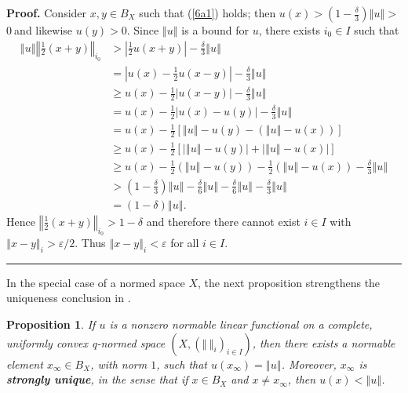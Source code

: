 \documentclass[11pt]{article}%
\newtheorem{proposition}[theorem]{Proposition}
\newenvironment{proof}[1][Proof]{\noindent\textbf{#1.} }{\ \rule{0.5em}{0.5em}}
\begin{document}
\begin{proof}
Consider $x,y\in B_{X}$ such that (\ref{6a1}) holds; then $u(x)>\left(
1-\frac{\delta}{3}\right)  \left\Vert u\right\Vert >$ $0\ $and likewise
$u(y)>0$. Since $\left\Vert u\right\Vert $ is a bound for $u$, there exists
$i_{0}\in I$ such that%
\begin{align*}
\left\Vert u\right\Vert \left\Vert \frac{1}{2}\left(  x+y\right)  \right\Vert
_{i_{0}} &  >\left\vert \frac{1}{2}u(x+y)\right\vert -\frac{\delta}%
{3}\left\Vert u\right\Vert \\
&  =\left\vert u(x)-\frac{1}{2}u(x-y)\right\vert -\frac{\delta}{3}\left\Vert
u\right\Vert \\
&  \geq u(x)-\frac{1}{2}\left\vert u(x-y)\right\vert -\frac{\delta}%
{3}\left\Vert u\right\Vert \\
&  =u(x)-\frac{1}{2}\left\vert u(x)-u(y)\right\vert -\frac{\delta}%
{3}\left\Vert u\right\Vert \\
&  =u(x)-\frac{1}{2}\left[  \left\Vert u\right\Vert -u(y)-\left(  \left\Vert
u\right\Vert -u(x)\right)  \right]  \\
&  \geq u(x)-\frac{1}{2}\left[  \left\vert \left\Vert u\right\Vert
-u(y)\right\vert +\left\vert \left\Vert u\right\Vert -u(x)\right\vert \right]
\\
&  \geq u(x)-\frac{1}{2}(\left\Vert u\right\Vert -u(y))-\frac{1}{2}\left(
\left\Vert u\right\Vert -u(x)\right)  -\frac{\delta}{3}\left\Vert u\right\Vert
\\
&  >\left(  1-\frac{\delta}{3}\right)  \left\Vert u\right\Vert -\frac{\delta
}{6}\left\Vert u\right\Vert -\frac{\delta}{6}\left\Vert u\right\Vert
-\frac{\delta}{3}\left\Vert u\right\Vert \\
&  =\left(  1-\delta\right)  \left\Vert u\right\Vert .\text{ }%
\end{align*}
Hence $\left\Vert \frac{1}{2}(x+y)\right\Vert _{i_{0}}>1-\delta$ and therefore
there cannot exist $i\in I$ with $\left\Vert x-y\right\Vert _{i}%
>\varepsilon/2$. Thus $\left\Vert x-y\right\Vert _{i}<\varepsilon$ for all
$i\in I$.
\end{proof}

%

\bigskip


In the special case of a normed space $X$, the next proposition strengthens
the uniqueness conclusion in \cite[2.3.7]{BVtech}.

\begin{proposition}
\label{feb24p2}If $u$ is a nonzero normable linear functional on a complete,
uniformly convex q-normed space $\left(  X,\left(  \left\Vert \ \right\Vert
_{i}\right)  _{i\in I}\right)  $, then there exists a normable element
$x_{\infty}\in B_{X}$, with norm $1$, such that $u(x_{\infty})=\left\Vert
u\right\Vert $. Moreover, $x_{\infty}$ is \textbf{strongly unique}, in the
sense that if $x\in B_{X}$ and $x\neq x_{\infty}$, then $u(x)<\left\Vert
u\right\Vert $.
\end{proposition}
\end{document}
